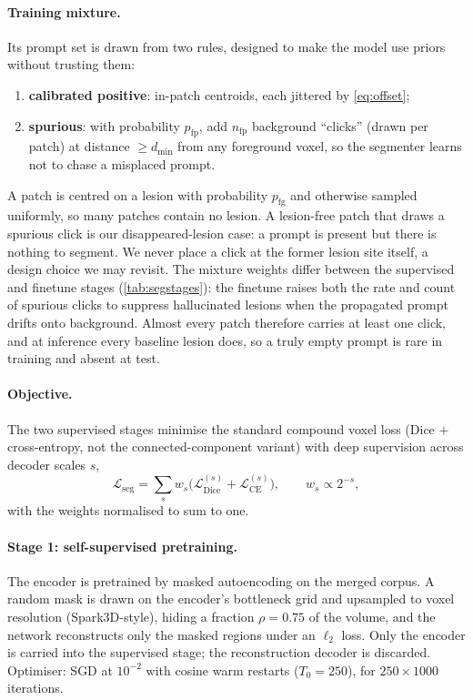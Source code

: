 \paragraph{Training mixture.} Its prompt set is drawn from two rules, designed to
make the model use priors without trusting them:
\begin{enumerate}[nosep,label=(\roman*)]
  \item \textbf{calibrated positive}: in-patch centroids, each jittered by
  \cref{eq:offset};
  \item \textbf{spurious}: with probability $p_{\mathrm{fp}}$, add $n_{\mathrm{fp}}$
  background ``clicks'' (drawn per patch) at distance $\ge d_{\min}$ from any
  foreground voxel, so the segmenter learns not to chase a misplaced prompt.
\end{enumerate}
A patch is centred on a lesion with probability $p_{\mathrm{fg}}$ and otherwise
sampled uniformly, so many patches contain no lesion. A lesion-free patch that
draws a spurious click is our disappeared-lesion case: a prompt is present but there
is nothing to segment. We never place a click at the former lesion site itself, a
design choice we may revisit. The mixture weights differ between the supervised and
finetune stages (\cref{tab:segstages}): the finetune raises both the rate and count
of spurious clicks to suppress hallucinated lesions when the propagated prompt
drifts onto background. Almost every patch therefore carries at least one click,
and at inference every baseline lesion does, so a truly empty prompt is rare in
training and absent at test.
 
\paragraph{Objective.} The two supervised stages minimise the standard compound
voxel loss (Dice $+$ cross-entropy, not the connected-component variant) with deep
supervision across decoder scales $s$,
\begin{equation}
\mathcal{L}_{\mathrm{seg}}
=\sum_{s} w_s\big(\mathcal{L}_{\mathrm{Dice}}^{(s)}+\mathcal{L}_{\mathrm{CE}}^{(s)}\big),
\qquad w_s\propto 2^{-s},
\label{eq:segloss}
\end{equation}
with the weights normalised to sum to one.
 
\paragraph{Stage 1: self-supervised pretraining.} The encoder is pretrained by
masked autoencoding on the merged corpus. A random mask is drawn on the encoder's
bottleneck grid and upsampled to voxel resolution (Spark3D-style), hiding a
fraction $\rho=0.75$ of the volume, and the network reconstructs only the masked
regions under an $\ell_2$ loss. Only the encoder is carried into the supervised
stage; the reconstruction decoder is discarded. Optimiser: SGD at $10^{-2}$ with
cosine warm restarts ($T_0=250$), for $250\times1000$ iterations.
 
